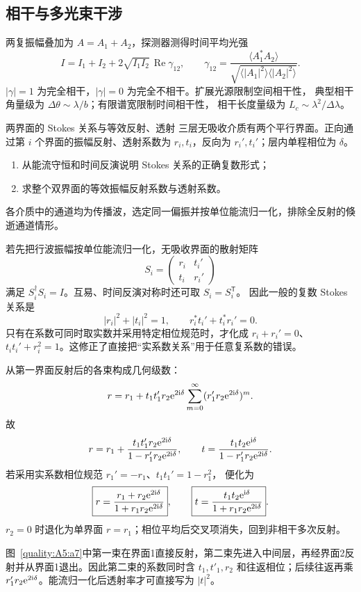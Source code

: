 \subsection{相干与多光束干涉}

两复振幅叠加为 $A=A_1+A_2$，探测器测得时间平均光强
\[
 I=I_1+I_2+2\sqrt{I_1I_2}\,
 \operatorname{Re}\gamma_{12},
\qquad
 \gamma_{12}=
 \frac{\langle A_1^*A_2\rangle}
 {\sqrt{\langle|A_1|^2\rangle\langle|A_2|^2\rangle}}.
\]
$|\gamma|=1$ 为完全相干，$|\gamma|=0$ 为完全不相干。扩展光源限制空间相干性，
典型相干角量级为 $\Delta\theta\sim\lambda/b$；有限谱宽限制时间相干性，
相干长度量级为 $L_c\sim\lambda^2/\Delta\lambda$。

\begin{advexamplebox}{两界面的 Stokes 关系与等效反射、透射}\label{advA5:ex:multibeam}
三层无吸收介质有两个平行界面。正向通过第 $i$ 个界面的振幅反射、透射系数为
$r_i,t_i$，反向为 $r_i',t_i'$；层内单程相位为 $\delta$。

\begin{enumerate}
\item 从能流守恒和时间反演说明 Stokes 关系的正确复数形式；
\item 求整个双界面的等效振幅反射系数与透射系数。
\end{enumerate}

各介质中的通道均为传播波，选定同一偏振并按单位能流归一化，排除全反射的倏逝通道情形。

\end{advexamplebox}
\begin{advsolution}
若先把行波振幅按单位能流归一化，无吸收界面的散射矩阵
\[
 S_i=\begin{pmatrix}r_i&t_i'\\ t_i&r_i'\end{pmatrix}
\]
满足 $S_i^\dagger S_i=I$。互易、时间反演对称时还可取 $S_i=S_i^{\mathsf T}$。
因此一般的复数 Stokes 关系是
\[
 |r_i|^2+|t_i|^2=1,\qquad
 r_i^*t_i'+t_i^*r_i'=0.
\]
只有在系数可同时取实数并采用特定相位规范时，才化成
$r_i+r_i'=0$、$t_it_i'+r_i^2=1$。这修正了直接把“实系数关系”用于任意复系数的错误。

从第一界面反射后的各束构成几何级数：
\[
 r=r_1+t_1t_1'r_2\mathrm e^{2\mathrm i\delta}
 \sum_{m=0}^{\infty}(r_1'r_2\mathrm e^{2\mathrm i\delta})^m.
\]
故
\[
 r=r_1+\frac{t_1t_1'r_2\mathrm e^{2\mathrm i\delta}}
 {1-r_1'r_2\mathrm e^{2\mathrm i\delta}},
\qquad
 t=\frac{t_1t_2\mathrm e^{\mathrm i\delta}}
 {1-r_1'r_2\mathrm e^{2\mathrm i\delta}}.
\]
若采用实系数相位规范 $r_1'=-r_1$、$t_1t_1'=1-r_1^2$，
便化为
\[
 \boxed{r=\frac{r_1+r_2\mathrm e^{2\mathrm i\delta}}
 {1+r_1r_2\mathrm e^{2\mathrm i\delta}}},
 \qquad
 \boxed{t=\frac{t_1t_2\mathrm e^{\mathrm i\delta}}
 {1+r_1r_2\mathrm e^{2\mathrm i\delta}}}.
\]
$r_2=0$ 时退化为单界面 $r=r_1$；相位平均后交叉项消失，回到非相干多次反射。


图~\ref{quality:A5:a7}中第一束在界面1直接反射，第二束先进入中间层，再经界面2反射并从界面1退出。因此第二束的系数同时含 $t_1,t'_1,r_2$ 和往返相位；后续往返再乘 $r'_1r_2\mathrm e^{2\mathrm i\delta}$。能流归一化后透射率才可直接写为 $|t|^2$。
\end{advsolution}

